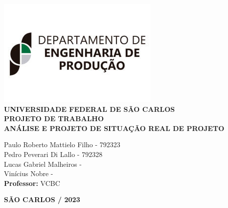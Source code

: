 \justifying %
\onehalfspacing %
\setlength{\parindent}{0cm}  %
\renewcommand*\familydefault{\rmdefault}
\thispagestyle{empty}
\begin{center}
\includegraphics[scale=0.6]{logo-dep.jpg}\\
\vspace*{.8cm}
{\huge \textbf{UNIVERSIDADE FEDERAL DE SÃO CARLOS}}\\
\vspace*{.8cm}
{\Large \textbf{PROJETO DE TRABALHO}}\\
\vspace*{3cm}
{\Large \textbf{ANÁLISE E PROJETO DE SITUAÇÃO REAL DE PROJETO}}\\
\vspace*{4.5cm}
\begin{flushright}
    \onehalfspacing
    {\Large  Paulo Roberto Mattielo Filho - 792323}\\
    {\Large  Pedro Peverari Di Lallo - 792328}\\
    {\Large  Lucas Gabriel Malheiros - }\\
    {\Large  Vinícius Nobre - }\\
    \vspace*{.3cm}
    {\Large \textbf{Professor:}}
    {\Large VCBC}\\
\end{flushright}
\vspace*{\fill}
{\large \bf SÃO CARLOS / 2023}
\end{center}

